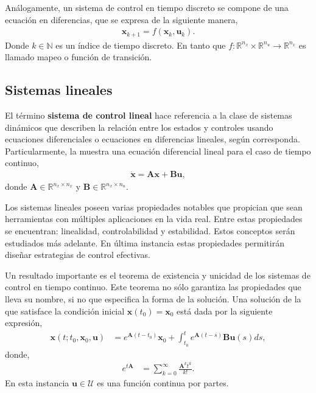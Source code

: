 Análogamente, un sistema de control en tiempo discreto se compone de una ecuación en diferencias, que se expresa de la siguiente manera,
\begin{align}
\label{eq:control_system_dis}
    \mathbf{x}_{k+1}= f(\mathbf{x}_k, \mathbf{u}_k ).
\end{align}
Donde $k\in \mathbb{N}$ es un índice de tiempo discreto. En tanto que $f:\mathbb{R}^{n_x}\times\mathbb{R}^{n_u}\rightarrow\mathbb{R}^{n_x}$ es llamado mapeo o función de transición. \cite{Gruene2021}

\subsection{Sistemas lineales}
El término \textbf{sistema de control lineal} hace referencia a la clase de sistemas dinámicos que describen la relación entre los estados y controles usando ecuaciones diferenciales o ecuaciones en diferencias lineales, según corresponda. Particularmente, la  muestra una ecuación diferencial lineal para el caso de tiempo continuo, 
\begin{align}\label{eq:linear_control_system}
    \dot{\mathbf{x}} = \mathbf{A}\mathbf{x}+\mathbf{B}\mathbf{u},
\end{align}
donde $\mathbf{A}\in \mathbb{R}^{n_x\times n_x}$ y $ \mathbf{B}\in\mathbb{R}^{n_x\times n_u}$. \cite{Gruene2021}

Los sistemas lineales poseen varias propiedades notables que propician que sean herramientas con múltiples aplicaciones en la vida real. Entre estas propiedades se encuentran: linealidad, controlabilidad y estabilidad. Estos conceptos serán estudiados más adelante. En última instancia estas propiedades permitirán diseñar estrategias de control efectivas.

Un resultado importante es el teorema de existencia y unicidad de los sistemas de control en tiempo continuo. Este teorema no sólo garantiza las propiedades que lleva su nombre, si no que especifica la forma de la solución. Una solución de la  que satisface la condición inicial $\mathbf{x}(t_0)=\mathbf{x}_0$ está dada por la siguiente expresión,
\begin{align}\label{eq:linear_solution}
    \mathbf{x}(t;t_0, \mathbf{x}_0, \mathbf{u}) &=
    e^{\mathbf{A}(t-t_0)}\mathbf{x}_0 + \int_{t_0}^{t}e^{\mathbf{A}(t-s)}\mathbf{Bu}(s)ds,
\end{align}
donde,
\begin{align}
    e^{t\mathbf{A}} &= \sum^{\infty}_{k=0}\frac{\mathbf{A}^kt^k}{k!}.
\end{align}
En esta instancia $\mathbf{u}\in \mathcal{U}$ es una función continua por partes. \cite{Gruene2021}

